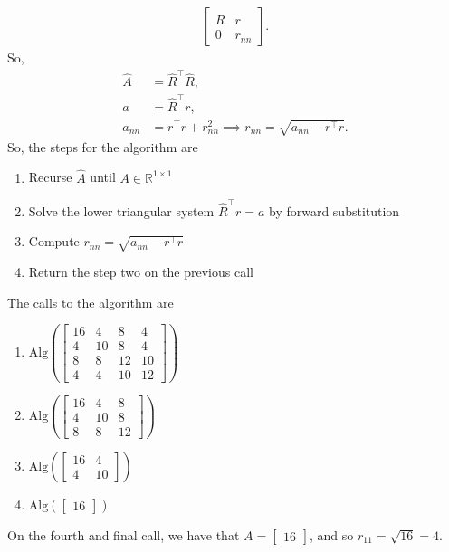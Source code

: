 \documentclass{report}
\begin{document}
\begin{remark}
\begin{align*}
        \begin{bmatrix}
            \hat{R} & r \\
            0 & r_{nn}
        \end{bmatrix}
    .\end{align*}
    So, 
    \begin{align*}
        \hat{A} &= \hat{R}^{\top}\hat{R}, \\
        a &= \hat{R}^{\top}r, \\
        a_{nn} &= r^{\top}r + r_{nn}^{2} \implies r_{nn} = \sqrt{a_{nn} - r^{\top}r}
    .\end{align*}
    So, the steps for the algorithm are 
    \begin{enumerate}
        \item Recurse $\hat{A}$ until $A \in \mathbb{R}^{1\times 1}$
        \item Solve the lower triangular system $\hat{R}^{\top}r = a$ by forward substitution
        \item Compute $r_{nn} = \sqrt{a_{nn} - r^{\top}r} $
        \item Return the step two on the previous call
    \end{enumerate}
    The calls to the algorithm are
    \begin{enumerate}
        \item $\text{Alg}\left( \begin{bmatrix} 16 & 4 & 8 & 4 \\ 4 & 10 & 8 & 4 \\ 8 & 8 & 12 & 10 \\ 4 & 4 & 10 & 12 \end{bmatrix} \right) $
        \item $\text{Alg}\left(\begin{bmatrix} 16 & 4 & 8 \\ 4 & 10 & 8 \\ 8 & 8 & 12 \end{bmatrix}\right) $
        \item $\text{Alg}\left(\begin{bmatrix} 16 & 4 \\ 4 & 10 \end{bmatrix}\right) $
        \item $\text{Alg}\left(\begin{bmatrix} 16 \end{bmatrix}\right) $
    \end{enumerate}
    On the fourth and final call, we have that $A = \begin{bmatrix} 16 \end{bmatrix} $, and so $r_{11} = \sqrt{16} = 4$. 

\end{remark}
\end{document}
